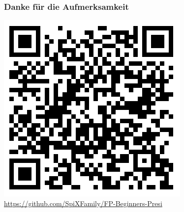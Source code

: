 \documentclass{beamer}
\begin{document}
\begin{frame}
 \begin{figure}
    \centering
    \frametitle{Danke für die Aufmerksamkeit}
    \includegraphics[width=0.5\linewidth]{bilder/git-GI.png}
\textmd{\url{https://github.com/SpiXFamily/FP-Beginners-Presi}}
\end{figure}
\end{frame}
\end{document}
